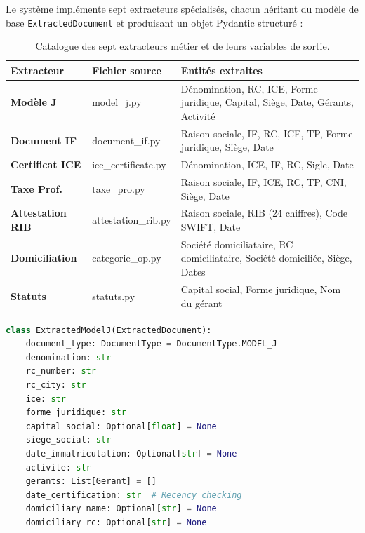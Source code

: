 Le syst\`{e}me impl\'{e}mente sept extracteurs sp\'{e}cialis\'{e}s, chacun h\'{e}ritant du mod\`{e}le de base \texttt{ExtractedDocument} et produisant un objet Pydantic structur\'{e} :

\begin{table}[H]
\centering
\small
\begin{tabularx}{\textwidth}{@{}>{\bfseries}p{2.6cm} >{\ttfamily\small\raggedright\arraybackslash}p{3.2cm} Y@{}}
\toprule
{}
Extracteur & Fichier source & Entit\'{e}s extraites \\
\midrule
Mod\`{e}le J & model\_j.py & D\'{e}nomination, RC, ICE, Forme juridique, Capital, Si\`{e}ge, Date, G\'{e}rants, Activit\'{e} \\
Document IF & document\_if.py & Raison sociale, IF, RC, ICE, TP, Forme juridique, Si\`{e}ge, Date \\
Certificat ICE & ice\_certificate.py & D\'{e}nomination, ICE, IF, RC, Sigle, Date \\
Taxe Prof. & taxe\_pro.py & Raison sociale, IF, ICE, RC, TP, CNI, Si\`{e}ge, Date \\
Attestation RIB & attestation\_rib.py & Raison sociale, RIB (24 chiffres), Code SWIFT, Date \\
Domiciliation & categorie\_op.py & Soci\'{e}t\'{e} domiciliataire, RC domiciliataire, Soci\'{e}t\'{e} domicili\'{e}e, Si\`{e}ge, Dates \\
Statuts & statuts.py & Capital social, Forme juridique, Nom du g\'{e}rant \\
\bottomrule
\end{tabularx}
\caption{Catalogue des sept extracteurs m\'{e}tier et de leurs variables de sortie.}
\label{tab:extracteurs-catalogue}
\end{table}

\begin{lstlisting}[language=Python, caption={Mod\`{e}le de donn\'{e}es Pydantic pour le Mod\`{e}le J (document.py).}, label={lst:model-j-pydantic}]
class ExtractedModelJ(ExtractedDocument):
    document_type: DocumentType = DocumentType.MODEL_J
    denomination: str
    rc_number: str
    rc_city: str
    ice: str
    forme_juridique: str
    capital_social: Optional[float] = None
    siege_social: str
    date_immatriculation: Optional[str] = None
    activite: str
    gerants: List[Gerant] = []
    date_certification: str  # Recency checking
    domiciliary_name: Optional[str] = None
    domiciliary_rc: Optional[str] = None
\end{lstlisting}

